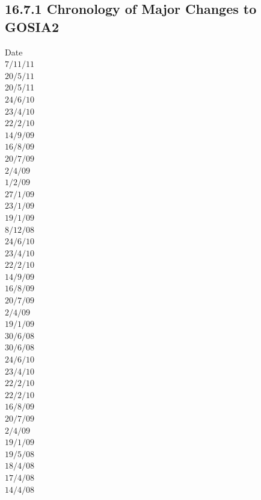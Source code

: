 \documentclass[10pt]{article}
\begin{document}
\subsection*{16.7.1 Chronology of Major Changes to GOSIA2}
Date\\
$7 / 11 / 11$\\
$20 / 5 / 11$\\
20/5/11\\
$24 / 6 / 10$\\
$23 / 4 / 10$\\
$22 / 2 / 10$\\
$14 / 9 / 09$\\
$16 / 8 / 09$\\
$20 / 7 / 09$\\
$2 / 4 / 09$\\
$1 / 2 / 09$\\
$27 / 1 / 09$\\
$23 / 1 / 09$\\
$19 / 1 / 09$\\
$8 / 12 / 08$\\
$24 / 6 / 10$\\
$23 / 4 / 10$\\
$22 / 2 / 10$\\
$14 / 9 / 09$\\
$16 / 8 / 09$\\
$20 / 7 / 09$\\
$2 / 4 / 09$\\
$19 / 1 / 09$\\
$30 / 6 / 08$\\
$30 / 6 / 08$\\
$24 / 6 / 10$\\
$23 / 4 / 10$\\
$22 / 2 / 10$\\
$22 / 2 / 10$\\
$16 / 8 / 09$\\
$20 / 7 / 09$\\
$2 / 4 / 09$\\
$19 / 1 / 09$\\
$19 / 5 / 08$\\
$18 / 4 / 08$\\
$17 / 4 / 08$\\
$14 / 4 / 08$
\end{document}

